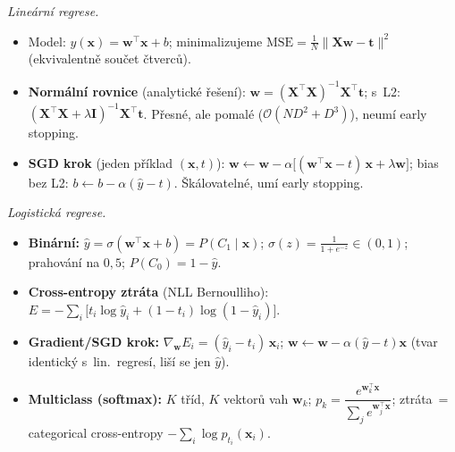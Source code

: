\begin{poznamka}
\smallskip
\emph{Lineární regrese.}
\begin{itemize}
  \item Model: $y(\mathbf{x})=\mathbf{w}^\top\mathbf{x}+b$; minimalizujeme $\mathrm{MSE}=\tfrac1N\|\mathbf{X}\mathbf{w}-\mathbf{t}\|^2$ (ekvivalentně součet čtverců).
  \item \textbf{Normální rovnice} (analytické řešení): $\mathbf{w}=(\mathbf{X}^\top\mathbf{X})^{-1}\mathbf{X}^\top\mathbf{t}$; s~L2: $(\mathbf{X}^\top\mathbf{X}+\lambda\mathbf{I})^{-1}\mathbf{X}^\top\mathbf{t}$. Přesné, ale pomalé ($\mathcal O(ND^2+D^3)$), neumí early stopping.
  \item \textbf{SGD krok} (jeden příklad $(\mathbf{x},t)$): $\mathbf{w}\leftarrow\mathbf{w}-\alpha\bigl[(\mathbf{w}^\top\mathbf{x}-t)\,\mathbf{x}+\lambda\mathbf{w}\bigr]$; bias bez L2: $b\leftarrow b-\alpha(\hat y-t)$. Škálovatelné, umí early stopping.
\end{itemize}

\smallskip
\emph{Logistická regrese.}
\begin{itemize}
  \item \textbf{Binární:} $\hat y=\sigma(\mathbf{w}^\top\mathbf{x}+b)=P(C_1\mid\mathbf{x})$; $\sigma(z)=\frac{1}{1+e^{-z}}\in(0,1)$; prahování na $0{,}5$; $P(C_0)=1-\hat y$.
  \item \textbf{Cross-entropy ztráta} (NLL Bernoulliho): $E=-\sum_i\bigl[t_i\log\hat y_i+(1-t_i)\log(1-\hat y_i)\bigr]$.
  \item \textbf{Gradient/SGD krok:} $\nabla_{\mathbf{w}}E_i=(\hat y_i-t_i)\,\mathbf{x}_i$; $\mathbf{w}\leftarrow\mathbf{w}-\alpha(\hat y-t)\mathbf{x}$ (tvar identický s~lin.\ regresí, liší se jen $\hat y$).
  \item \textbf{Multiclass (softmax):} $K$ tříd, $K$ vektorů vah $\mathbf{w}_k$; $p_k=\dfrac{e^{\mathbf{w}_k^\top\mathbf{x}}}{\sum_j e^{\mathbf{w}_j^\top\mathbf{x}}}$; ztráta~= categorical cross-entropy $-\sum_i\log p_{t_i}(\mathbf{x}_i)$.
\end{itemize}


\end{poznamka}
